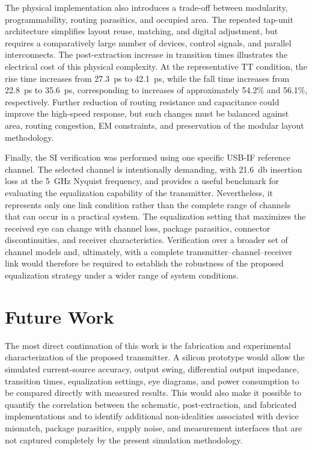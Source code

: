 The physical implementation also introduces a trade-off between modularity, programmability, routing parasitics, and occupied area. The repeated tap-unit architecture simplifies layout reuse, matching, and digital adjustment, but requires a comparatively large number of devices, control signals, and parallel interconnects. The post-extraction increase in transition times illustrates the electrical cost of this physical complexity. At the representative \ac{TT} condition, the rise time increases from 27.3~ps to 42.1~ps, while the fall time increases from 22.8~ps to 35.6~ps, corresponding to increases of approximately 54.2\% and 56.1\%, respectively. Further reduction of routing resistance and capacitance could improve the high-speed response, but such changes must be balanced against area, routing congestion, \ac{EM} constraints, and preservation of the modular layout methodology.

Finally, the \ac{SI} verification was performed using one specific \ac{USB-IF} reference channel. The selected channel is intentionally demanding, with \SI{21.6}{\decibel} insertion loss at the \SI{5}{\giga\hertz} Nyquist frequency, and provides a useful benchmark for evaluating the equalization capability of the transmitter. Nevertheless, it represents only one link condition rather than the complete range of channels that can occur in a practical system. The equalization setting that maximizes the received eye can change with channel loss, package parasitics, connector discontinuities, and receiver characteristics. Verification over a broader set of channel models and, ultimately, with a complete transmitter--channel--receiver link would therefore be required to establish the robustness of the proposed equalization strategy under a wider range of system conditions.

\section{Future Work}

The most direct continuation of this work is the fabrication and experimental characterization of the proposed transmitter. A silicon prototype would allow the simulated current-source accuracy, output swing, differential output impedance, transition times, equalization settings, eye diagrams, and power consumption to be compared directly with measured results. This would also make it possible to quantify the correlation between the schematic, post-extraction, and fabricated implementations and to identify additional non-idealities associated with device mismatch, package parasitics, supply noise, and measurement interfaces that are not captured completely by the present simulation methodology.

